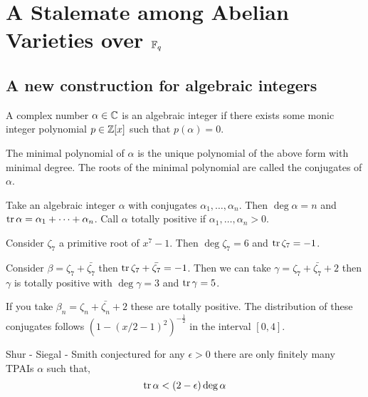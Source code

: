 \documentclass[12pt]{article}
\begin{document}
\section{A Stalemate among Abelian Varieties over $\mathbb{F}_q$}

\subsection{A new construction for algebraic integers}

\begin{defn}
A complex number $\alpha \in \mathbb{C}$ is an algebraic integer if there exists some monic integer polynomial $p \in \mathbb{Z}[x]$ such that $p(\alpha) = 0$.
\end{defn}

\begin{defn}
The minimal polynomial of $\alpha$ is the unique polynomial of the above form with minimal degree. The roots of the minimal polynomial are called the conjugates of $\alpha$.
\end{defn}

\begin{defn}
Take an algebraic integer $\alpha$ with conjugates $\alpha_1, \dots, \alpha_n$. Then $\deg{\alpha} = n$ and $\operatorname{\mathrm{tr}}{\alpha} = \alpha_1 + \cdots + \alpha_n$. Call $\alpha$ totally positive if $\alpha_1, \dots, \alpha_n > 0$.
\end{defn}

\begin{example}
Consider $\zeta_7$ a primitive root of $x^7 - 1$. Then $\deg{\zeta_7} = 6$ and $\operatorname{\mathrm{tr}}{\zeta_7} = -1$. 
\end{example}

\begin{example}
Consider $\beta = \zeta_7 + \bar{\zeta_7}$ then $\operatorname{\mathrm{tr}}{\zeta_7 + \bar{\zeta_7}} = -1$. Then we can take $\gamma = \zeta_7 + \bar{\zeta_7} + 2$ then $\gamma$ is totally positive with $\deg{\gamma} = 3$ and $\operatorname{\mathrm{tr}}{\gamma} = 5$.
\end{example}

\begin{example}
If you take $\beta_n = \zeta_n + \bar{\zeta_n} + 2$ these are totally positive. The distribution of these conjugates follows $(1 - (x/2-1)^2)^{-\frac{1}{2}}$ in the interval $[0,4]$.
\end{example}

\begin{rmk}
Shur - Siegal - Smith conjectured for any $\epsilon > 0$ there are only finitely many TPAIs  $\alpha$ such that,
\[ \operatorname{\mathrm{tr}}{\alpha} < (2 - \epsilon) \deg{\alpha} \]
\end{rmk}
\end{document}
